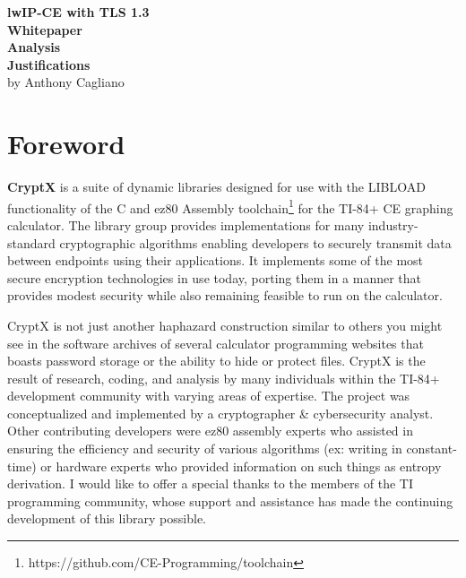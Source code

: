 \documentclass[titlepage]{report}
\begin{document}
	
	\begin{titlepage}
		\begin{center}
			\vspace*{1in}
			{\Large\textbf{lwIP-CE with TLS 1.3\\Whitepaper}}\\
			\vspace*{0.5in}
			{\huge\textbf{Analysis\\\vspace{10px}Justifications}}\\
			\vspace*{1in}
			by Anthony Cagliano
		\end{center}
	\end{titlepage}
	\setcounter{secnumdepth}{2}
	\setcounter{tocdepth}{2}
	\tableofcontents	
	
	\newpage
	\section{Foreword}
	
	
	\textbf{CryptX} is a suite of dynamic libraries designed for use with the LIBLOAD functionality of the C and ez80 Assembly toolchain\footnote{https://github.com/CE-Programming/toolchain} for the TI-84+ CE graphing calculator. The library group provides implementations for many industry-standard cryptographic algorithms enabling developers to securely transmit data between endpoints using their applications. It implements some of the most secure encryption technologies in use today, porting them in a manner that provides modest security while also remaining feasible to run on the calculator.
	
	CryptX is not just another haphazard construction similar to others you might see in the software archives of several calculator programming websites that boasts password storage or the ability to hide or protect files. CryptX is the result of research, coding, and analysis by many individuals within the TI-84+ development community with varying areas of expertise. The project was conceptualized and implemented by a cryptographer \& cybersecurity analyst. Other contributing developers were ez80 assembly experts who assisted in ensuring the efficiency and security of various algorithms (ex: writing in constant-time) or hardware experts who provided information on such things as entropy derivation. I would like to offer a special thanks to the members of the TI programming community, whose support and assistance has made the continuing development of this library possible.
	
\end{document}
